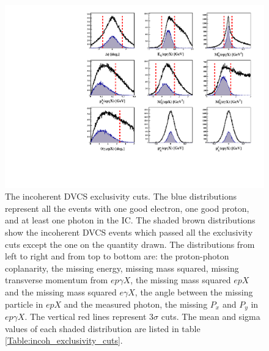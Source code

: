 \begin{figure}[h!]
\centering
\includegraphics[scale=0.9]{fig_Dec2016/all_incoh_exc_cuts.pdf}
\caption{The incoherent DVCS exclusivity cuts. The blue distributions represent 
   all the events with one good electron, one good proton, and at least one 
   photon in the IC. The shaded brown distributions show the incoherent DVCS 
   events which passed all the exclusivity cuts except the one on the quantity 
   drawn. The distributions from left to right and from top to bottom are: the 
   proton-photon coplanarity, the missing energy, missing mass squared, missing 
   transverse momentum from $ep\gamma X$, the missing mass squared $epX$ and 
   the missing mass squared $e\gamma X$, the angle between the missing particle 
   in $epX$ and the measured photon, the missing $P_{x}$ and $P_{y}$ in 
   $ep\gamma X$. The vertical red lines represent 3$\sigma$ cuts. The mean and 
   sigma values of each shaded distribution are listed in table 
\ref{Table:incoh_exclusivity_cuts}.} \label{fig:incoh_exclusivty_cuts}
\end{figure}

